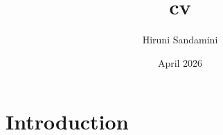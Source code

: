 \documentclass{article}
\title{cv}
\author{Hiruni Sandamini}
\date{April 2026}
\begin{document}
\maketitle

\section{Introduction}
\end{document}
